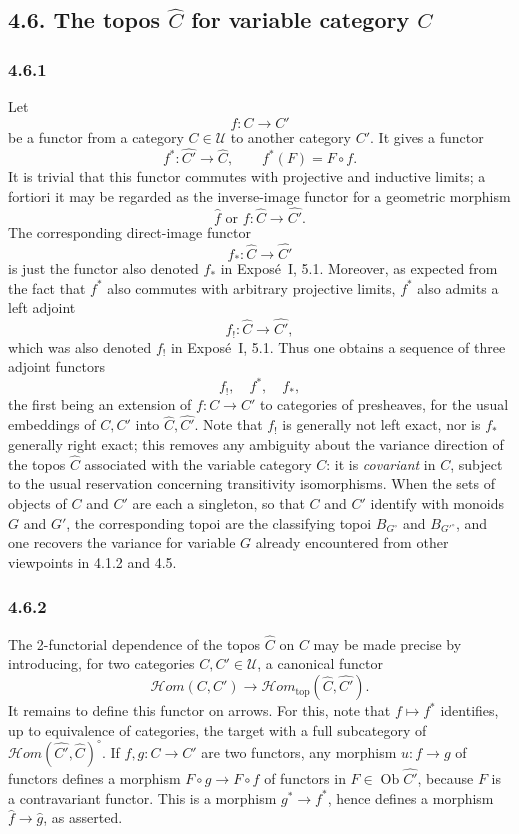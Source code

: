 \documentclass[11pt]{article}
\newcommand{\U}{\mathcal{U}}
\newcommand{\Ob}{\operatorname{Ob}}
\newcommand{\Hhom}{\mathcal{H}om}
\newcommand{\Hhomtop}{\mathcal{H}om_{\mathrm{top}}}
\begin{document}
\subsection*{4.6. The topos \(\widehat C\) for variable category \(C\)}

\subsubsection*{4.6.1}
Let
\[
f:C\longrightarrow C'
\]
be a functor from a category \(C\in\U\) to another category \(C'\). It gives a functor
\[
f^\ast:\widehat{C'}\longrightarrow\widehat C,
\qquad
f^\ast(F)=F\circ f.
\]
It is trivial that this functor commutes with projective and inductive limits; a fortiori it may be regarded as the inverse-image functor for a geometric morphism
\[
\widehat f\text{ or }f:\widehat C\longrightarrow\widehat{C'}.
\]
The corresponding direct-image functor
\[
f_\ast:\widehat C\longrightarrow\widehat{C'}
\]
is just the functor also denoted \(f_\ast\) in Expos\'e~I, 5.1. Moreover, as expected from the fact that \(f^\ast\) also commutes with arbitrary projective limits, \(f^\ast\) also admits a left adjoint
\[
f_!:\widehat C\longrightarrow\widehat{C'},
\]
which was also denoted \(f_!\) in Expos\'e~I, 5.1. Thus one obtains a sequence of three adjoint functors
\[
f_!,\quad f^\ast,\quad f_\ast,
\]
the first being an extension of \(f:C\to C'\) to categories of presheaves, for the usual embeddings of \(C,C'\) into \(\widehat C,\widehat{C'}\). Note that \(f_!\) is generally not left exact, nor is \(f_\ast\) generally right exact; this removes any ambiguity about the variance direction of the topos \(\widehat C\) associated with the variable category \(C\): it is \emph{covariant} in \(C\), subject to the usual reservation concerning transitivity isomorphisms. When the sets of objects of \(C\) and \(C'\) are each a singleton, so that \(C\) and \(C'\) identify with monoids \(G\) and \(G'\), the corresponding topoi are the classifying topoi \(B_{G^\circ}\) and \(B_{{G'}^\circ}\), and one recovers the variance for variable \(G\) already encountered from other viewpoints in 4.1.2 and 4.5.

\subsubsection*{4.6.2}
The 2-functorial dependence of the topos \(\widehat C\) on \(C\) may be made precise by introducing, for two categories \(C,C'\in\U\), a canonical functor
\[
\Hhom(C,C')\longrightarrow\Hhomtop(\widehat C,\widehat{C'}).\tag{4.6.2.1}
\]
It remains to define this functor on arrows. For this, note that \(f\mapsto f^\ast\) identifies, up to equivalence of categories, the target with a full subcategory of \(\Hhom(\widehat{C'},\widehat C)^\circ\). If \(f,g:C\to C'\) are two functors, any morphism \(u:f\to g\) of functors defines a morphism \(F\circ g\to F\circ f\) of functors in \(F\in\Ob\widehat{C'}\), because \(F\) is a contravariant functor. This is a morphism \(g^\ast\to f^\ast\), hence defines a morphism \(\widehat f\to\widehat g\), as asserted.
\end{document}
